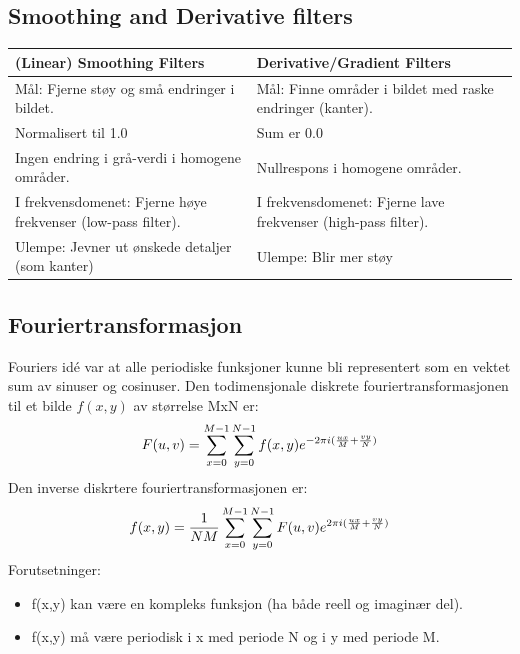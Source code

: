 \subsection{Smoothing and Derivative filters}
\begin{center}
    \begin{tabular}{| p{5cm} | p{5cm} |}
        \hline
            (Linear) Smoothing Filters & Derivative/Gradient Filters \\ 
        \hline
            Mål: Fjerne støy og små endringer i bildet. & Mål: Finne områder i bildet med raske endringer (kanter). \\
        \hline
            Normalisert til 1.0 & Sum er 0.0 \\
        \hline
            Ingen endring i grå-verdi i homogene områder. & Nullrespons i homogene områder. \\
        \hline
            I frekvensdomenet: Fjerne høye frekvenser (low-pass filter). & I frekvensdomenet: Fjerne lave frekvenser (high-pass filter).\\
        \hline
            Ulempe: Jevner ut ønskede detaljer (som kanter) & Ulempe: Blir mer støy \\
        \hline
    \end{tabular}
\end{center}

\subsection{Fouriertransformasjon}
Fouriers idé var at alle periodiske funksjoner kunne bli representert som en vektet sum av sinuser og cosinuser.
Den todimensjonale diskrete fouriertransformasjonen til et bilde $f(x,y)$ av størrelse MxN er:
\begin{equation}
    F(u,v) = \sum_{x=0}^{M-1}\sum_{y=0}^{N-1} f(x,y) e^{
        -2\pi i( {ux \over M} + {vy \over N} )
    }
\end{equation}
Den inverse diskrtere fouriertransformasjonen er:
\begin{equation}
    f(x,y) = {1 \over NM}\sum_{x=0}^{M-1}\sum_{y=0}^{N-1} F(u,v) e^{
        2\pi i( {ux \over M} + {vy \over N} )
    }
\end{equation}
Forutsetninger:
\begin{itemize}
    \item f(x,y) kan være en kompleks funksjon (ha både reell og imaginær del).
    \item f(x,y) må være periodisk i x med periode N og i y med periode M.
\end{itemize}

